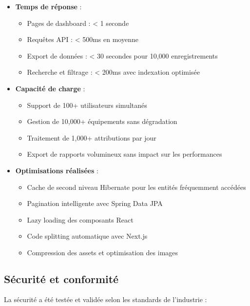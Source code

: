 \documentclass[12pt,a4paper]{report}
\begin{document}
\begin{itemize}
\item \textbf{Temps de réponse} : 
  \begin{itemize}
  \item Pages de dashboard : < 1 seconde
  \item Requêtes API : < 500ms en moyenne
  \item Export de données : < 30 secondes pour 10,000 enregistrements
  \item Recherche et filtrage : < 200ms avec indexation optimisée
  \end{itemize}

\item \textbf{Capacité de charge} :
  \begin{itemize}
  \item Support de 100+ utilisateurs simultanés
  \item Gestion de 10,000+ équipements sans dégradation
  \item Traitement de 1,000+ attributions par jour
  \item Export de rapports volumineux sans impact sur les performances
  \end{itemize}

\item \textbf{Optimisations réalisées} :
  \begin{itemize}
  \item Cache de second niveau Hibernate pour les entités fréquemment accédées
  \item Pagination intelligente avec Spring Data JPA
  \item Lazy loading des composants React
  \item Code splitting automatique avec Next.js
  \item Compression des assets et optimisation des images
  \end{itemize}
\end{itemize}

\subsection{Sécurité et conformité}
La sécurité a été testée et validée selon les standards de l'industrie :
\end{document}
